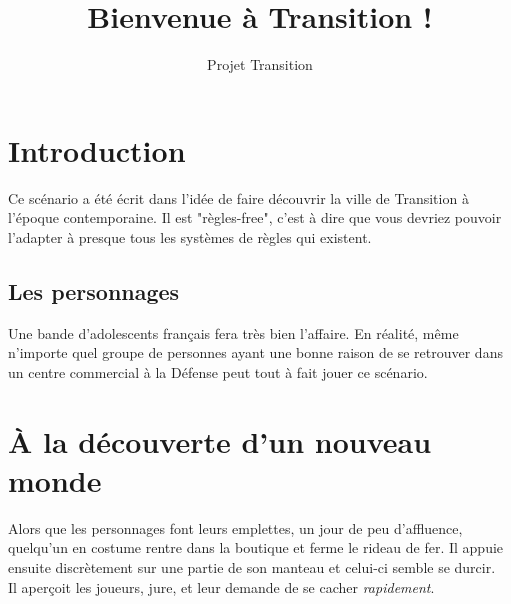 \documentclass[10pt,a4paper,twocolumn]{article}
\author{Projet Transition}
\title{Bienvenue à Transition !}
\begin{document}
\maketitle
\section{Introduction}
Ce scénario a été écrit dans l'idée de faire découvrir la ville de Transition à l'époque contemporaine. Il est "règles-free", c'est à dire que vous devriez pouvoir l'adapter à presque tous les systèmes de règles qui existent.
\subsection{Les personnages}
Une bande d'adolescents français fera très bien l'affaire. En réalité, même n'importe quel groupe de personnes ayant une bonne raison de se retrouver dans un centre commercial à la Défense peut tout à fait jouer ce scénario.

\section{À la découverte d'un nouveau monde}
Alors que les personnages font leurs emplettes, un jour de peu d'affluence, quelqu'un en costume rentre dans la boutique et ferme le rideau de fer. Il appuie ensuite discrètement sur une partie de son manteau et celui-ci semble se durcir.\\
Il aperçoit les joueurs, jure, et leur demande de se cacher \emph{rapidement}.
\end{document}
